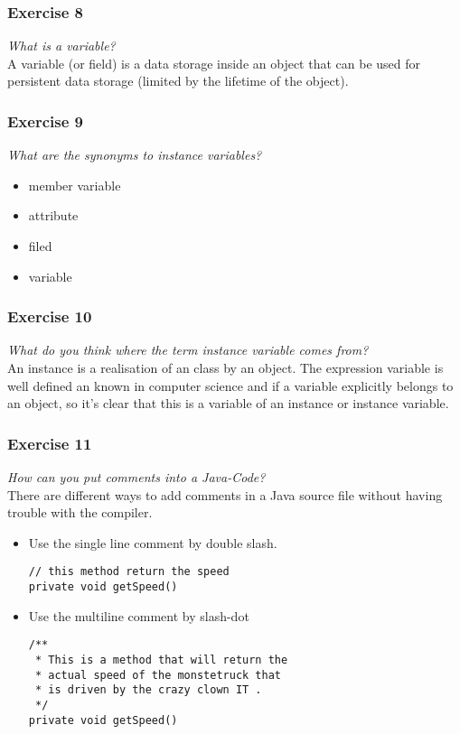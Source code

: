 \subsubsection*{Exercise 8}
\textit{What is a variable?}\\

A variable (or field) is a data storage inside an object that can be used for
persistent data storage (limited by the lifetime of the object).

\subsubsection*{Exercise 9}
\textit{What are the synonyms to instance variables?}\\

\begin{itemize}
	\item member variable
	\item attribute
	\item filed
	\item variable
\end{itemize}

\subsubsection*{Exercise 10}
\textit{What do you think where the term instance variable comes from?}\\

An instance is a realisation of an class by an object. The expression variable
is well defined an known in computer science and if a variable explicitly
belongs to an object, so it's clear that this is a variable of an instance or
instance variable.

\subsubsection*{Exercise 11}
\textit{How can you put comments into a Java-Code?}\\

There are different ways to add comments in a Java source file without having
trouble with the compiler.

\begin{itemize} 
	\item Use the single line comment by double slash.
\begin{lstlisting}
// this method return the speed
private void getSpeed()
\end{lstlisting}
	\item Use the multiline comment by slash-dot
\begin{lstlisting}
/**
 * This is a method that will return the
 * actual speed of the monstetruck that
 * is driven by the crazy clown IT .
 */
private void getSpeed()
\end{lstlisting}
\end{itemize}

